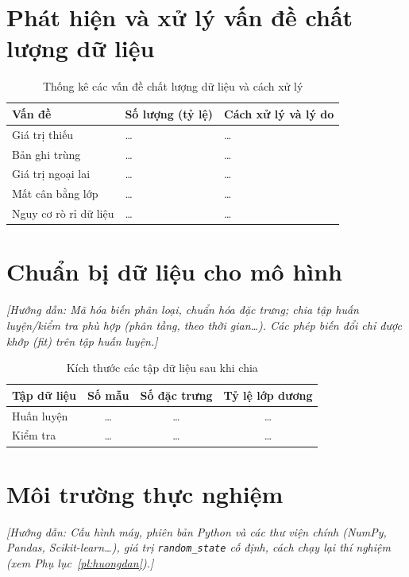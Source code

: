 \documentclass[12pt,a4paper,oneside]{report}
\newcommand{\huongdan}[1]{{\color{guide}\itshape [Hướng dẫn: #1]}}
\begin{document}
\section{Phát hiện và xử lý vấn đề chất lượng dữ liệu}

\begin{table}[H]
  \centering
  \caption{Thống kê các vấn đề chất lượng dữ liệu và cách xử lý}
  \label{tab:chatluong}
  \begin{tabularx}{\textwidth}{p{3.2cm} >{\centering\arraybackslash}p{2.6cm} X}
    \toprule
    \textbf{Vấn đề} & \textbf{Số lượng (tỷ lệ)} & \textbf{Cách xử lý và lý do} \\
    \midrule
    Giá trị thiếu       & \dots & \dots \\
    Bản ghi trùng       & \dots & \dots \\
    Giá trị ngoại lai   & \dots & \dots \\
    Mất cân bằng lớp    & \dots & \dots \\
    Nguy cơ rò rỉ dữ liệu & \dots & \dots \\
    \bottomrule
  \end{tabularx}
\end{table}

\section{Chuẩn bị dữ liệu cho mô hình}
\huongdan{Mã hóa biến phân loại, chuẩn hóa đặc trưng; chia tập huấn
luyện/kiểm tra phù hợp (phân tầng, theo thời gian\dots). Các phép biến đổi
chỉ được khớp (fit) trên tập huấn luyện.}

\begin{table}[H]
  \centering
  \caption{Kích thước các tập dữ liệu sau khi chia}
  \label{tab:kichthuoc}
  \begin{tabular}{lccc}
    \toprule
    \textbf{Tập dữ liệu} & \textbf{Số mẫu} & \textbf{Số đặc trưng} & \textbf{Tỷ lệ lớp dương} \\
    \midrule
    Huấn luyện & \dots & \dots & \dots \\
    Kiểm tra   & \dots & \dots & \dots \\
    \bottomrule
  \end{tabular}
\end{table}

\section{Môi trường thực nghiệm}
\huongdan{Cấu hình máy, phiên bản Python và các thư viện chính
(NumPy, Pandas, Scikit-learn\dots), giá trị \texttt{random\_state} cố định, cách
chạy lại thí nghiệm (xem Phụ lục~\ref{pl:huongdan}).}
\end{document}
